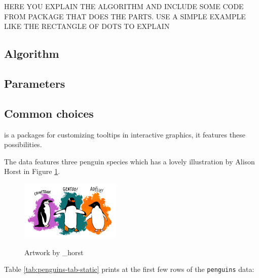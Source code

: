 HERE YOU EXPLAIN THE ALGORITHM AND INCLUDE SOME CODE FROM PACKAGE THAT DOES THE PARTS. USE A SIMPLE EXAMPLE LIKE THE RECTANGLE OF DOTS TO EXPLAIN

\subsection{Algorithm}\label{algorithm}

\subsection{Parameters}\label{parameters}

\subsection{Common choices}\label{common-choices}

 is a packages for customizing tooltips in interactive graphics, it features these possibilities.

The  data \citep{palmerpenguins} features three penguin species which has a lovely illustration by Alison Horst in Figure \ref{fig:penguins-alison}.

\begin{figure}
\includegraphics[width=1\linewidth,height=0.3\textheight,alt={A picture of three different penguins with their species: Chinstrap, Gentoo, and Adelie. }]{figures/penguins} \caption{Artwork by \@allison\_horst}\label{fig:penguins-alison}
\end{figure}

Table \ref{tab:penguins-tab-static} prints at the first few rows of the \texttt{penguins} data:

